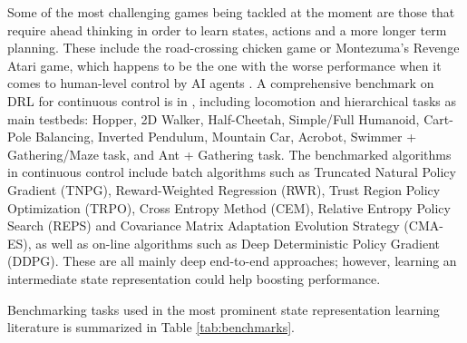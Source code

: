 \documentclass[a4paper]{article}
\begin{document}
Some of the most challenging games being tackled at the moment are those that require ahead thinking in order to learn states, actions and a more longer term planning. These include the road-crossing chicken game \cite{Machado17a} or Montezuma's Revenge Atari game, which happens to be the one with the worse performance when it comes to human-level control by AI agents \cite{Mnih15}. A comprehensive benchmark on DRL for continuous control is in \cite{Duan16}, including locomotion and hierarchical tasks as main testbeds: Hopper, 2D Walker, Half-Cheetah, Simple/Full Humanoid, Cart-Pole Balancing, Inverted Pendulum, Mountain Car, Acrobot, Swimmer + Gathering/Maze task, and Ant + Gathering task. The benchmarked algorithms in continuous control include batch algorithms such as Truncated Natural Policy Gradient (TNPG), Reward-Weighted Regression (RWR), Trust Region Policy Optimization (TRPO), Cross Entropy Method (CEM), Relative Entropy Policy Search (REPS) and Covariance Matrix Adaptation Evolution Strategy (CMA-ES), as well as on-line algorithms such as Deep Deterministic Policy Gradient (DDPG). These are all mainly  deep end-to-end approaches; however, learning an intermediate state representation could help boosting performance.

Benchmarking tasks used in the most prominent state representation learning literature is summarized in Table \ref{tab:benchmarks}.
\end{document}

